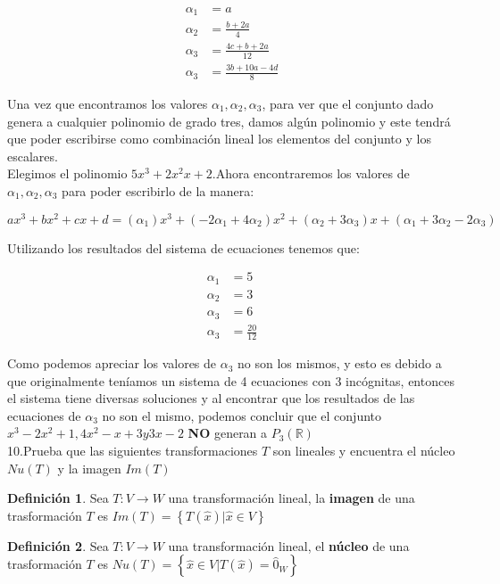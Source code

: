 \documentclass[letterpaper]{article}
\newcommand{\R}{\mathds{R}}
\renewcommand{\*}{\cdot}
\theoremstyle{definition}
\newtheorem{definition}{Definición}
\begin{document}
	\begin{center}
		\begin{align*}
		\alpha_{1}&=a\\
		\alpha_{2}&=\frac{b+2a}{4}\\
		\alpha_{3}&=\frac{4c+b+2a}{12}\\
		\alpha_{3}&=\frac{3b+10a-4d}{8}
		\end{align*}
	\end{center}

Una vez que encontramos los valores $\alpha_{1}, \alpha_{2}, \alpha_{3}$, para ver que el conjunto dado genera a cualquier polinomio de grado tres, damos algún polinomio y este tendrá que poder escribirse como combinación lineal los elementos del conjunto y los escalares.\\

Elegimos el polinomio $5x^3+2x^2x+2$.Ahora encontraremos los valores de $\alpha_{1}, \alpha_{2}, \alpha_{3}$ para poder escribirlo de la manera:
\begin{center}
	$ax^3+bx^2+cx+d = (\alpha_{1})x^3 + (-2\alpha_{1}+4\alpha_{2})x^2 + (\alpha_{2}+3\alpha_{3})x + (\alpha_{1}+3\alpha_{2}-2\alpha_{3})$
\end{center} 
Utilizando los resultados del sistema de ecuaciones tenemos que:

		\begin{align*}
		\alpha_{1}&=5\\
		\alpha_{2}&=3\\
		\alpha_{3}&=6\\
		\alpha_{3}&=\frac{20}{12}
		\end{align*}
		
Como podemos apreciar los valores de $\alpha_{3}$ no son los mismos, y esto es debido a que originalmente teníamos un sistema de 4 ecuaciones con 3 incógnitas, entonces el sistema tiene diversas soluciones y al encontrar que los resultados de las ecuaciones de $\alpha_{3}$ no son el mismo, podemos concluir que el conjunto $x^3-2x^2+1,4x^2-x+3 y 3x-2$  \textbf{NO} generan a $P_{3}(\R)$\\

\noindent 10.Prueba que las siguientes transformaciones $T$ son lineales y encuentra el núcleo $Nu(T)$ y la imagen $Im(T)$

\begin{definition}
	Sea $ T: V \rightarrow W $ una transformación lineal, la \textbf{imagen} de una trasformación $ T $ es $Im(T) = \left\lbrace T(\hat{x}) | \hat{x} \in V  \right\rbrace$
\end{definition}
\begin{definition}
	Sea $ T: V \rightarrow W $ una transformación lineal, el \textbf{núcleo} de una trasformación $ T $ es $Nu(T) = \left\lbrace \hat{x} \in V | T(\hat{x}) = \hat{0}_{W}  \right\rbrace$
\end{definition}
\end{document}
